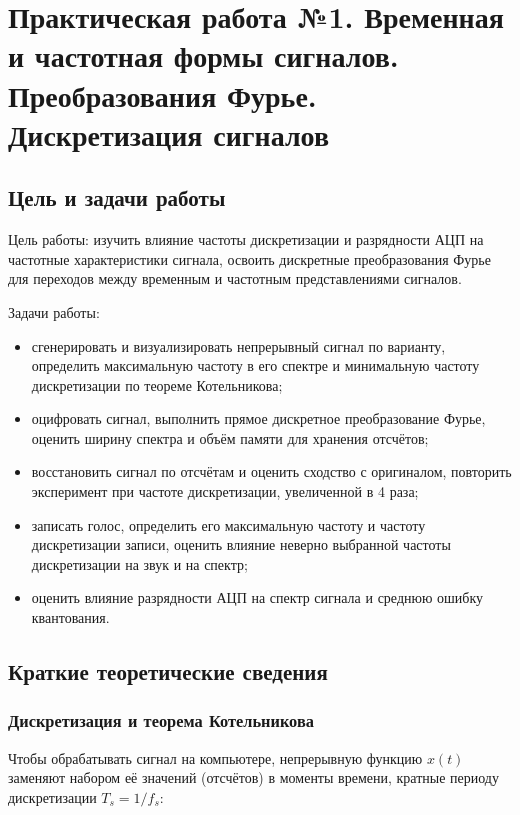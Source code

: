 \documentclass[a4paper,14pt,oneside,openany]{memoir}
\begin{document}
\chapter{Практическая работа №1. Временная и частотная формы сигналов. Преобразования Фурье. Дискретизация сигналов}
\label{ch:lab1}

\section{Цель и задачи работы}

Цель работы: изучить влияние частоты дискретизации и разрядности АЦП на частотные характеристики сигнала, освоить дискретные преобразования Фурье для переходов между временным и частотным представлениями сигналов.

Задачи работы:

\begin{itemize}
  \item сгенерировать и визуализировать непрерывный сигнал по варианту, определить максимальную частоту в его спектре и минимальную частоту дискретизации по теореме Котельникова;
  \item оцифровать сигнал, выполнить прямое дискретное преобразование Фурье, оценить ширину спектра и объём памяти для хранения отсчётов;
  \item восстановить сигнал по отсчётам и оценить сходство с оригиналом, повторить эксперимент при частоте дискретизации, увеличенной в 4 раза;
  \item записать голос, определить его максимальную частоту и частоту дискретизации записи, оценить влияние неверно выбранной частоты дискретизации на звук и на спектр;
  \item оценить влияние разрядности АЦП на спектр сигнала и среднюю ошибку квантования.
\end{itemize}

\section{Краткие теоретические сведения}

\subsection{Дискретизация и теорема Котельникова}

Чтобы обрабатывать сигнал на компьютере, непрерывную функцию $x(t)$ заменяют набором её значений (отсчётов) в моменты времени, кратные периоду дискретизации $T_s = 1/f_s$:
\end{document}
